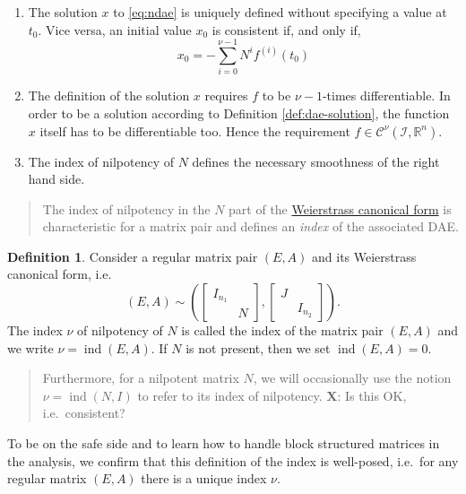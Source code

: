 \documentclass[]{book}
\newenvironment {JHSAYS} [0] {\begin{quote}\color{jhsc}} {\end{quote}}
\theoremstyle{definition}
\newtheorem{definition}{Definition}[chapter]
\theoremstyle{definition}
\theoremstyle{definition}
\theoremstyle{definition}
\theoremstyle{remark}
\begin{document}
\begin{enumerate}
\def\labelenumi{\arabic{enumi}.}
\item
  The solution \(x\) to \eqref{eq:ndae} is uniquely defined without specifying a value at \(t_0\). Vice versa, an initial value \(x_0\) is consistent if, and only if,
  \[
  x_0 = - \sum_{i=0}^{\nu-1}N^if^{(i)}(t_0)
  \]
\item
  The definition of the solution \(x\) requires \(f\) to be \(\nu-1\)-times differentiable. In order to be a solution according to Definition \ref{def:dae-solution}, the function \(x\) itself has to be differentiable too. Hence the requirement \(f \in \mathcal C^\nu(\mathcal I, \mathbb R^{n})\).
\item
  The index of nilpotency of \(N\) defines the necessary smoothness of the right hand side.
\end{enumerate}

\begin{JHSAYS}
The index of nilpotency in the \(N\) part of the
\protect\hyperlink{eq:weierstrass-cf}{Weierstrass canonical form} is
characteristic for a matrix pair and defines an \emph{index} of the
associated DAE.
\end{JHSAYS}

\begin{definition}
\protect\hypertarget{def:matrix-pair-index}{}{\label{def:matrix-pair-index} }Consider a regular matrix pair \((E, A)\) and its Weierstrass canonical form, i.e.
\[
(E, A) \sim 
\left (
\begin{bmatrix}
I_{n_1} \\
& N
\end{bmatrix}
,
\begin{bmatrix}
J \\
& I_{n_2}
\end{bmatrix}
\right ).
\]
The index \(\nu\) of nilpotency of \(N\) is called the index of the matrix pair \((E, A)\) and we write \(\nu = \operatorname{ind}(E, A)\). If \(N\) is not present, then we set \(\operatorname{ind}(E,A)=0\).
\end{definition}

\begin{JHSAYS}
Furthermore, for a nilpotent matrix \(N\), we will occasionally use the
notion \(\nu=\operatorname{ind}(N,I)\) to refer to its index of nilpotency.
\textbf{X}: Is this OK, i.e.~consistent?
\end{JHSAYS}

To be on the safe side and to learn how to handle block structured matrices in the analysis, we confirm that this definition of the index is well-posed, i.e.~for any regular matrix \((E,A)\) there is a unique index \(\nu\).
\end{document}
